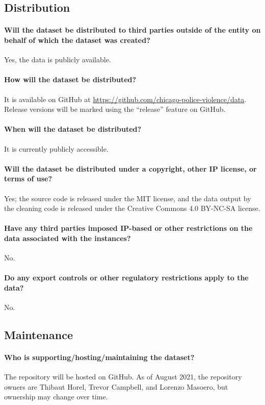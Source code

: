 \subsection{Distribution}

\paragraph{Will the dataset be distributed to third parties outside of the entity on behalf of which the dataset was created?}
Yes, the data is publicly available.

\paragraph{How will the dataset be distributed?}
It is available on GitHub at \url{https://github.com/chicago-police-violence/data}.
Release versions will be marked using the ``release'' feature on GitHub.

\paragraph{When will the dataset be distributed?}
It is currently publicly accessible.

\paragraph{Will the dataset be distributed under a copyright, other IP license, or terms of use?}
Yes; the source code is released under the MIT license, and the data output by the cleaning code is released under the Creative Commons 4.0 BY-NC-SA license.

\paragraph{Have any third parties imposed IP-based or other restrictions on the data associated with the instances?}
No.

\paragraph{Do any export controls or other regulatory restrictions apply to the data?}
No.

\subsection{Maintenance}

\paragraph{Who is supporting/hosting/maintaining the dataset?}
The repository will be hosted on GitHub. As of August 2021, the repository
owners are Thibaut Horel, Trevor Campbell, and Lorenzo Masoero, but ownership
may change over time.


